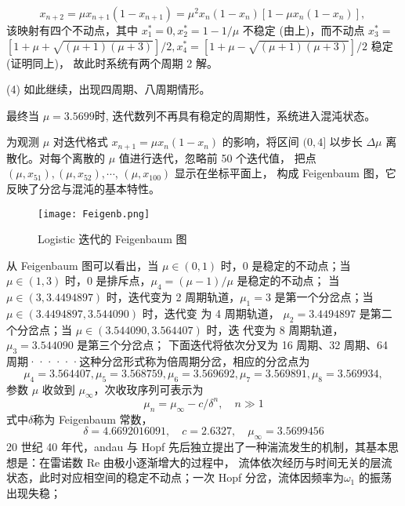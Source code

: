 \begin{equation}
    x_{n+2}=\mu x_{n+1}\left(1-x_{n+1}\right)=\mu^2 x_n\left(1-x_n\right)\left[1-\mu x_n\left(1-x_n\right)\right] \text {, }
\end{equation}
该映射有四个不动点，其中 $x_1^*=0, x_2^*=1-1 / \mu$ 不稳定 (由上)，而不动点 
$x_3^*=$ $[1+\mu+\sqrt{(\mu+1)(\mu+3)}] / 2, x_4^*=[1+\mu-\sqrt{(\mu+1)(\mu+3)}] / 2$ 稳定 (证明同上)， 故此时系统有两个周期 2 解。\par
(4) 如此继续，出现四周期、八周期情形。\par
最终当 $\mu= 3.5699$时, 迭代数列不再具有稳定的周期性，系统进入混沌状态。\par
为观测 $\mu$ 对迭代格式 $x_{n+1}=\mu x_n\left(1-x_n\right)$ 的影响，将区间 $(0,4]$ 以步长 $\Delta \mu$ 离散化。对每个离散的 $\mu$ 值进行迭代，忽略前 50 个迭代值，
把点 $\left(\mu, x_{51}\right),\left(\mu, x_{52}\right), \cdots$, $\left(\mu, x_{100}\right)$ 显示在坐标平面上，
构成 Feigenbaum 图，它反映了分岔与混沌的基本特性。
\begin{figure}[!htbp]
    \centering
    \texttt{[image: Feigenb.png]}
    \caption{Logistic 迭代的 Feigenbaum 图}
\end{figure}
从 Feigenbaum 图可以看出，当 $\mu \in(0,1)$ 时，0 是稳定的不动点；当 $\mu \in(1,3)$ 时，0 是排斥点，$\mu_4=(\mu-1) / \mu$ 是稳定的不动点；
当 $\mu \in(3,3.4494897)$ 时，迭代变为 2 周期轨道，$\mu_1=3$ 是第一个分岔点；当 $\mu \in(3.4494897,3.544090)$ 时，迭代变 为 4 周期轨道，
$\mu_2=3.4494897$ 是第二个分岔点；当 $\mu \in(3.544090,3.564407)$ 时，迭 代变为 8 周期轨道，$\mu_3=3.544090$ 是第三个分岔点；
下面迭代将依次分叉为 16 周期、32 周期、64 周期······这种分岔形式称为倍周期分岔，相应的分岔点为
\begin{equation*}
   \mu_4=3.564407, \mu_5=3.568759, \mu_6=3.569692, \mu_7=3.569891, \mu_8=3.569934,
\end{equation*}
参数 $\mu$ 收敛到 $\mu_{\infty}$，次收玫序列可表示为
\begin{equation}
    \mu_n=\mu_{\infty}-c / \delta^n, \quad n \gg 1
\end{equation}
式中$\delta$称为 Feigenbaum 常数，
\begin{equation}
    \delta=4.6692016091, \quad c=2.6327, \quad \mu_{\infty}=3.5699456
\end{equation}
20 世纪 40 年代，andau 与 Hopf 先后独立提出了一种湍流发生的机制，其基本思想是：在雷诺数 Re 由极小逐渐增大的过程中，
流体依次经历与时间无关的层流状态，此时对应相空间的稳定不动点；一次 Hopf 分岔，流体因频率为$\omega_1$ 的振荡出现失稳；
